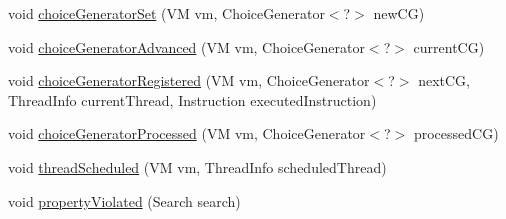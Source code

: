 \begin{DoxyCompactItemize}
\item 
void \hyperlink{classgov_1_1nasa_1_1jpf_1_1inspector_1_1server_1_1jpf_1_1_inspector_listener_mode_notifications_a09d0ca6dbe255095cacf387c366b0055}{choice\+Generator\+Set} (VM vm, Choice\+Generator$<$?$>$ new\+CG)
\item 
void \hyperlink{classgov_1_1nasa_1_1jpf_1_1inspector_1_1server_1_1jpf_1_1_inspector_listener_mode_notifications_a9c653ee8e1d4e0e5139b9fb29ffb9cbd}{choice\+Generator\+Advanced} (VM vm, Choice\+Generator$<$?$>$ current\+CG)
\item 
void \hyperlink{classgov_1_1nasa_1_1jpf_1_1inspector_1_1server_1_1jpf_1_1_inspector_listener_mode_notifications_acd0ec8fe400f0f0cc5da0f0d71b5d744}{choice\+Generator\+Registered} (VM vm, Choice\+Generator$<$?$>$ next\+CG, Thread\+Info current\+Thread, Instruction executed\+Instruction)
\item 
void \hyperlink{classgov_1_1nasa_1_1jpf_1_1inspector_1_1server_1_1jpf_1_1_inspector_listener_mode_notifications_a1b867a0c1bc03768a3ebfc82505d99bc}{choice\+Generator\+Processed} (VM vm, Choice\+Generator$<$?$>$ processed\+CG)
\item 
void \hyperlink{classgov_1_1nasa_1_1jpf_1_1inspector_1_1server_1_1jpf_1_1_inspector_listener_mode_notifications_a83b583b869370cfa0ff5ef99cd935b91}{thread\+Scheduled} (VM vm, Thread\+Info scheduled\+Thread)
\item 
void \hyperlink{classgov_1_1nasa_1_1jpf_1_1inspector_1_1server_1_1jpf_1_1_inspector_listener_mode_notifications_adfa0199ca5efce48d7fe49c2ee9a72ba}{property\+Violated} (Search search)
\end{DoxyCompactItemize}

